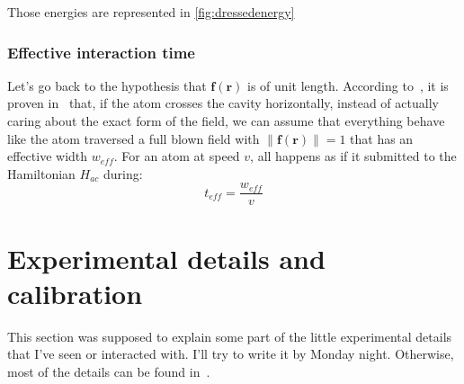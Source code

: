 \documentclass[10pt,a4paper]{report}
\theoremstyle{plain}
\theoremstyle{definition}
\theoremstyle{remark}
\newcommand{\TODO}{\textbf{TODO}}
\newcommand{\bs}{\boldsymbol}
\begin{document}
Those energies are represented in \cref{fig:dressedenergy}


\subsubsection{Effective interaction time}
\newcommand{\eff}{_{e\!f\!\!f}}

Let's go back to the hypothesis that $\bs f(\bs r)$ is of unit length. According
to~\cite{SayPHD11}, it is proven in~\cite{Har06} that, if the atom crosses the
cavity horizontally, instead of actually caring about the exact form of the
field, we can assume that everything behave like the atom traversed a full blown
field with $\|\bs f(\bs r)\| = 1$ that has an effective width $w\eff$. For an
atom at speed $v$, all happens as if it submitted to the Hamiltonian $H_{ac}$
during:
\[t\eff = \frac{w\eff}v\]









\section{Experimental details and calibration}


This section was supposed to explain some part of the little experimental details that I've seen
or interacted with. I'll try to write it by Monday night. Otherwise, most of the
details can be found in~\cite{SayPHD11}.
\end{document}
